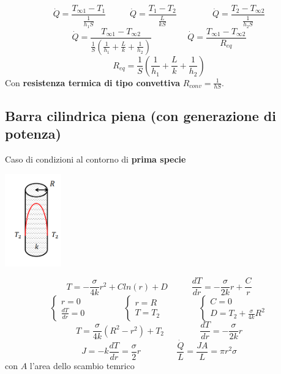 \[
    \dot{Q} = \frac{T_{\infty 1}- T_{1}}{\frac{1}{h_1 S}} \;\;\;\;\;\;\;\;\;\; \dot{Q} = \frac{T_1-T_2}{\frac{L}{kS}} \;\;\;\;\;\;\;\;\;\;\;\;\;\;\; \dot{Q} = \frac{T_2-T_{\infty 2}}{\frac{1}{h_2S}}
\]
\[
    \dot{Q} = \frac{T_{\infty 1} - T_{\infty 2}}{\frac{1}{S}\left(\frac{1}{h_1} + \frac{L}{k} + \frac{1}{h_2}\right)} \;\;\;\;\;\;\;\;\;\;\;\;\;\;\; \dot{Q} = \frac{T_{\infty 1} - T_{\infty 2}}{R_{eq}}
\]
\[
    R_{eq} = \frac{1}{S}\left(\frac{1}{h_1} + \frac{L}{k} + \frac{1}{h_2}\right)
\]
Con \textbf{resistenza termica di tipo convettiva} $R_{conv} = \frac{1}{hS}$.
\subsection{Barra cilindrica piena (con generazione di potenza)}
Caso di condizioni al contorno di \textbf{prima specie}
\begin{center}
    \includegraphics[height=4cm]{../L10/img6.PNG}
\end{center}

\[
    T= - \frac{\sigma}{4k} r^2 + C ln(r) + D \;\;\;\;\;\;\;\;\;\; \frac{dT}{dr} = - \frac{\sigma}{2k}r + \frac{C}{r}
\]
\[
    \begin{cases}
        r = 0 \\ \frac{dT}{dr} = 0
    \end{cases} \;\;\;\;\;\;\;\;\;\;\;\;\;\;\;  \begin{cases}
        r=R \\ T=T_2 
    \end{cases}\;\;\;\;\;\;\;\;\;\;\;\;\;\;\; \begin{cases}
        C=0 \\ D = T_2 + \frac{\sigma}{4k} R^2
    \end{cases}
\]
\[
    T = \frac{\sigma}{4k} (R^2 - r^2) + T_2 \;\;\;\;\;\;\;\;\;\;\;\;\;\;\; \frac{dT}{dr}  = - \frac{\sigma}{2k}r
\]
\[
    J = -k \frac{dT}{dr} = \frac{\sigma}{2} r \;\;\;\;\;\;\;\;\;\;\;\;\;\;\; \frac{\dot{Q}}{L} = \frac{JA}{L} = \pi r^2 \sigma
\]
con $A$ l'area dello scambio temrico

